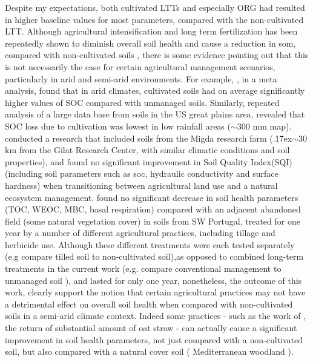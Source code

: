 	Despite my expectations, both cultivated LTTs and especially ORG had resulted in higher baseline values for most parameters, compared with the non-cultivated LTT. Although agricultural intensification and long term fertilization has been repeatedly shown to diminish overall soil health and cause a reduction in \gls{som}, compared with non-cultivated soils \citep{laurance2014, mganga2016, tilman2011}, there is some evidence pointing out that this is not necessarily the case for certain agricultural management scenarios, particularly in arid and semi-arid environments.  For example, \citet{trivedi2016}, in a meta analysis, found that in arid climates, cultivated soils had on average significantly higher values of SOC compared with unmanaged soils. Similarly, repeated analysis of a large data base from soils in the US great plains area, revealed that SOC loss due to cultivation was lowest in low rainfall areas ($ \sim $300 mm \acrshort{map})\citep{miller2004, burke1989}. \citet{paz-kagan2014} conducted a research that included soils from the Migda research farm ({\raise.17ex\hbox{$\scriptstyle\mathtt{\sim}$}}30 km from the Gilat Research Center, with similar climatic conditions and soil properties), and found no significant improvement in Soil Quality Index(SQI) (including soil parameters such as \gls{soc}, hydraulic conductivity and surface hardness) when transitioning between agricultural land use and a natural ecosystem management. \citet{garcia-orenes2010} found no significant decrease in soil health parameters (TOC, WEOC, MBC, basal respiration) compared with an adjacent abandoned field (some natural vegetation cover) in soils from SW Portugal, treated for one year by  a number of different agricultural practices, including tillage and herbicide use. Although these different treatments were each tested separately (e.g compare tilled soil to non-cultivated soil),as opposed to combined long-term treatments in the current work (e.g. compare conventional management to unmanaged soil ), and lasted for only one year, nonetheless, the outcome of this work, clearly support the notion that certain agricultural practices may not have a detrimental effect on overall soil health when compared with non-cultivated soils in a semi-arid climate context. Indeed some practices - such as the work of \citeauthor{garcia-orenes2010}, the return of substantial amount of oat straw - can actually cause a significant improvement in soil health parameters, not just compared with a non-cultivated soil, but also compared with a natural cover soil ( Mediterranean woodland ).\\
